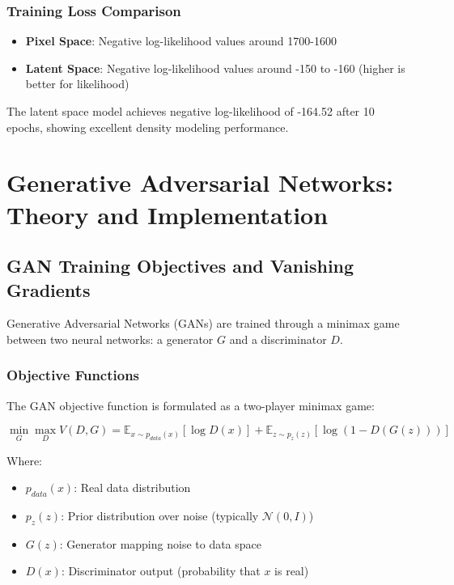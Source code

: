 \documentclass[conference,12pt]{IEEEtran}
\begin{document}
\subsubsection{Training Loss Comparison}

\begin{itemize}
    \item \textbf{Pixel Space}: Negative log-likelihood values around 1700-1600
    \item \textbf{Latent Space}: Negative log-likelihood values around -150 to -160 (higher is better for likelihood)
\end{itemize}

The latent space model achieves negative log-likelihood of -164.52 after 10 epochs, showing excellent density modeling performance.

\section{Generative Adversarial Networks: Theory and Implementation}

\subsection{GAN Training Objectives and Vanishing Gradients}

Generative Adversarial Networks (GANs) are trained through a minimax game between two neural networks: a generator $G$ and a discriminator $D$.

\subsubsection{Objective Functions}

The GAN objective function is formulated as a two-player minimax game:

\begin{equation}
    \min_G \max_D V(D, G) = \mathbb{E}_{x \sim p_{data}(x)}[\log D(x)] + \mathbb{E}_{z \sim p_z(z)}[\log(1-D(G(z)))]
\end{equation}

Where:
\begin{itemize}
    \item $p_{data}(x)$: Real data distribution
    \item $p_z(z)$: Prior distribution over noise (typically $\mathcal{N}(0, I)$)
    \item $G(z)$: Generator mapping noise to data space
    \item $D(x)$: Discriminator output (probability that $x$ is real)
\end{itemize}
\end{document}
